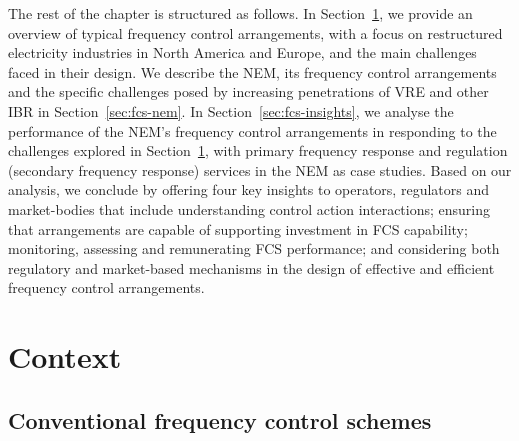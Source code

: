 \documentclass[12pt,a4paper,]{report}
\begin{document}
The rest of the chapter is structured as follows. In
Section~\ref{sec:fcs-context}, we provide an overview of typical
frequency control arrangements, with a focus on restructured electricity
industries in North America and Europe, and the main challenges faced in
their design. We describe the NEM, its frequency control arrangements
and the specific challenges posed by increasing penetrations of VRE and
other IBR in Section~\ref{sec:fcs-nem}. In
Section~\ref{sec:fcs-insights}, we analyse the performance of the NEM's
frequency control arrangements in responding to the challenges explored
in Section~\ref{sec:fcs-context}, with primary frequency response and
regulation (secondary frequency response) services in the NEM as case
studies. Based on our analysis, we conclude by offering four key
insights to operators, regulators and market-bodies that include
understanding control action interactions; ensuring that arrangements
are capable of supporting investment in FCS capability; monitoring,
assessing and remunerating FCS performance; and considering both
regulatory and market-based mechanisms in the design of effective and
efficient frequency control arrangements.

\hypertarget{sec:fcs-context}{%
\section{Context}\label{sec:fcs-context}}

\hypertarget{conventional-frequency-control-schemes}{%
\subsection{Conventional frequency control
schemes}\label{conventional-frequency-control-schemes}}
\end{document}
